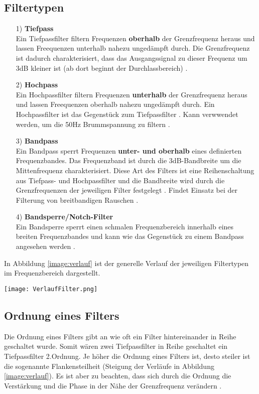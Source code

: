 \subsection*{Filtertypen}
\begin{itemize}
    \item[1)]\textbf{Tiefpass}\\
    Ein Tiefpassfilter filtern Frequenzen \textbf{oberhalb} der Grenzfrequenz heraus und lassen Freequenzen unterhalb nahezu ungedämpft durch. Die Grenzfrequenz ist dadurch charakterisiert, dass das Ausgangssignal zu dieser Frequenz um 3dB kleiner ist (ab dort beginnt der Durchlassbereich) \citep{electronik}.
    \item[2)]\textbf{Hochpass}\\
    Ein Hochpassfilter filtern Frequenzen \textbf{unterhalb} der Grenzfrequenz heraus und lassen Freequenzen oberhalb nahezu ungedämpft durch. Ein Hochpassfilter ist das Gegenstück zum Tiefpassfilter \citep{electronik}. Kann verwwendet werden, um die 50Hz Brummspannung zu filtern \citep{VA}.
    \item[3)]\textbf{Bandpass}\\
    Ein Bandpass sperrt Frequenzen \textbf{unter- und oberhalb} eines definierten Frequenzbandes. Das Frequenzband ist durch die 3dB-Bandbreite um die Mittenfrequenz charakterisiert. Diese Art des Filters ist eine Reihenschaltung aus Tiefpass- und Hochpassfilter und die Bandbreite wird durch die Grenzfrequenzen der jeweiligen Filter festgelegt \citep{electronik}. Findet Einsatz bei der Filterung von breitbandigen Rauschen \citep{VA}.
    \item[4)]\textbf{Bandsperre/Notch-Filter}\\
    Ein Bandsperre sperrt einen schmalen Frequenzbereich innerhalb eines breiten Frequenzbandes und kann wie das Gegenstück zu einem Bandpass angesehen werden \citep{electronik}.
\end{itemize}
In Abbildung \ref{image:verlauf} ist der generelle Verlauf der jeweiligen Filtertypen im Frequenzbereich dargestellt.
\newpage
\begin{center}
    \texttt{[image: VerlaufFilter.png]}
    \label{image:verlauf}
\end{center}
\subsection*{Ordnung eines Filters}
Die Ordnung eines Filters gibt an wie oft ein Filter hintereinander in Reihe geschaltet wurde. Somit wären zwei Tiefpassfilter in Reihe geschaltet ein Tiefpassfilter 2.Ordnung. Je höher die Ordnung eines Filters ist, desto steiler ist die sogenannte Flankensteilheit (Steigung der Verläufe in Abbildung \ref{image:verlauf}). Es ist aber zu beachten, dass sich durch die Ordnung die Verstärkung und die Phase in der Nähe der Grenzfrequenz verändern \citep{electronik}.
